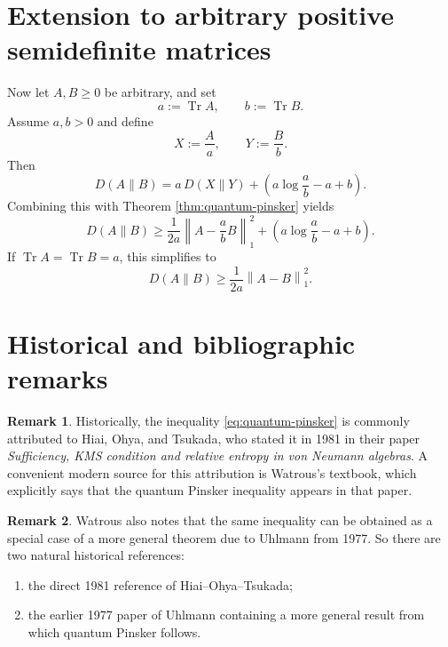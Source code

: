 \documentclass[11pt]{article}
\theoremstyle{definition}
\newtheorem{remark}{Remark}
\DeclareMathOperator{\Tr}{Tr}
\newcommand{\1}{\mathbf{1}}
\newcommand{\norm}[1]{\left\lVert #1 \right\rVert}
\begin{document}
\section{Extension to arbitrary positive semidefinite matrices}

Now let $A,B\ge 0$ be arbitrary, and set
\[
a:=\Tr A,\qquad b:=\Tr B.
\]
Assume $a,b>0$ and define
\[
X:=\frac{A}{a},\qquad Y:=\frac{B}{b}.
\]
Then
\begin{equation}\label{eq:matrix-splitting}
D(A\|B)=a\,D(X\|Y)+\left(a\log\frac{a}{b}-a+b\right).
\end{equation}
Combining this with Theorem \ref{thm:quantum-pinsker} yields
\begin{equation}\label{eq:PSD-extension}
D(A\|B)\ge
\frac{1}{2a}\norm{A-\frac{a}{b}B}_1^2
+
\left(a\log\frac{a}{b}-a+b\right).
\end{equation}
If $\Tr A=\Tr B=a$, this simplifies to
\begin{equation}\label{eq:equal-trace}
D(A\|B)\ge \frac{1}{2a}\norm{A-B}_1^2.
\end{equation}

\section{Historical and bibliographic remarks}

\begin{remark}
Historically, the inequality \eqref{eq:quantum-pinsker} is commonly attributed to Hiai, Ohya, and Tsukada, who stated it in 1981 in their paper
\emph{Sufficiency, KMS condition and relative entropy in von Neumann algebras}.
A convenient modern source for this attribution is Watrous's textbook, which explicitly says that the quantum Pinsker inequality appears in that paper.
\end{remark}

\begin{remark}
Watrous also notes that the same inequality can be obtained as a special case of a more general theorem due to Uhlmann from 1977. So there are two natural historical references:
\begin{enumerate}[label=(\arabic*)]
\item the direct 1981 reference of Hiai--Ohya--Tsukada;
\item the earlier 1977 paper of Uhlmann containing a more general result from which quantum Pinsker follows.
\end{enumerate}
\end{remark}
\end{document}
